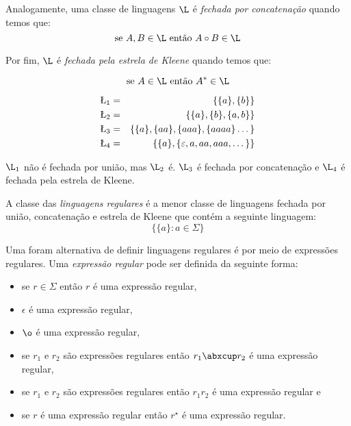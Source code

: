 Analogamente, uma classe de linguagens $\L$ é {\em fechada por concatenação} quando temos que:
\begin{displaymath}
\textrm{se }  A, B \in \L \textrm{ então } A \circ B \in \L
\end{displaymath}

Por fim, $\L$ é {\em fechada pela estrela de Kleene} quando temos que:

\begin{displaymath}
\textrm{se }  A \in \L \textrm{ então } A^* \in \L
\end{displaymath}

\begin{example}
  \begin{eqnarray*}
    \L_1 & = & \{\{a\}, \{b\}\} \\
    \L_2 & = & \{\{a\}, \{b\}, \{a, b\}\}\\
    \L_3 & = & \{\{a\}, \{aa\}, \{aaa\}, \{aaaa\} \dots\}\\
    \L_4 & = & \{\{a\}, \{\varepsilon, a, aa, aaa, \dots\}\}\\
  \end{eqnarray*}

  $\L_1$ não é fechada por união, mas $\L_2$ é.
  $\L_3$ é fechada por concatenação e $\L_4$ é fechada pela estrela de Kleene.
\end{example}

A classe das {\em linguagens regulares} é a menor classe de linguagens fechada por união, concatenação e estrela de Kleene que contém a seguinte linguagem:
\begin{displaymath}
  \{\{a\} : a \in \Sigma\}
\end{displaymath}

Uma foram alternativa de definir linguagens regulares é por meio de expressões regulares.
Uma {\em expressão regular} pode ser definida da seguinte forma:
\begin{itemize}
\item[] se $r \in \Sigma$ então $r$ é uma expressão regular,
\item[] $\epsilon$ é uma expressão regular,
\item[] $\o$ é uma expressão regular,
\item[] se $r_1$ e $r_2$ são expressões regulares então $r_1 \abxcup r_2$ é uma expressão regular,
\item[] se $r_1$ e $r_2$ são expressões regulares então $r_1 r_2$ é uma expressão regular e
\item[] se $r$ é uma expressão regular então $r^\star$ é uma expressão regular.
\end{itemize}



